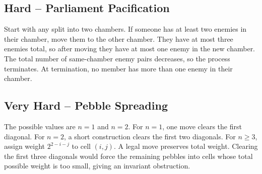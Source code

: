 \documentclass[12pt]{article}
\begin{document}
\subsection*{Hard -- Parliament Pacification}
Start with any split into two chambers. If someone has at least two
enemies in their chamber, move them to the other chamber. They have
at most three enemies total, so after moving they have at most one
enemy in the new chamber. The total number of same-chamber enemy
pairs decreases, so the process terminates. At termination, no member
has more than one enemy in their chamber.

\subsection*{Very Hard -- Pebble Spreading}
The possible values are $n=1$ and $n=2$. For $n=1$, one move clears
the first diagonal. For $n=2$, a short construction clears the first
two diagonals. For $n\ge3$, assign weight $2^{2-i-j}$ to cell
$(i,j)$. A legal move preserves total weight. Clearing the first
three diagonals would force the remaining pebbles into cells whose
total possible weight is too small, giving an invariant obstruction.
\end{document}
